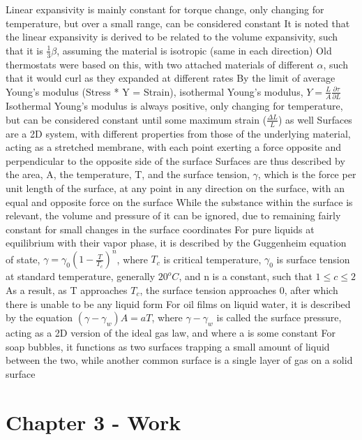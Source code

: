 \begin{outline*}
\4 Linear expansivity is mainly constant for torque change, only changing for temperature, but over a small range, can be considered constant
\4 It is noted that the linear expansivity is derived to be related to the volume expansivity, such that it is $\frac{1}{3}\beta$, assuming the material is isotropic (same in each direction)
\4 Old thermostats were based on this, with two attached materials of different $\alpha$, such that it would curl as they expanded at different rates
\3 By the limit of average Young's modulus (Stress * Y = Strain), isothermal Young's modulus, $Y = \frac{L}{A}\frac{\partial \tau}{\partial L}$
\4 Isothermal Young's modulus is always positive, only changing for temperature, but can be considered constant until some maximum strain ($\frac{\Delta L}{L}$) as well
\1 Surfaces are a 2D system, with different properties from those of the underlying material, acting as a stretched membrane, with each point exerting a force opposite and perpendicular to the opposite side of the surface
\2 Surfaces are thus described by the area, A, the temperature, T, and the surface tension, $\gamma$, which is the force per unit length of the surface, at any point in any direction on the surface, with an equal and opposite force on the surface
\2 While the substance within the surface is relevant, the volume and pressure of it can be ignored, due to remaining fairly constant for small changes in the surface coordinates
\2 For pure liquids at equilibrium with their vapor phase, it is described by the Guggenheim equation of state, $\gamma = \gamma_0(1 - \frac{T}{T_c})^n$, where $T_c$ is critical temperature, $\gamma_0$ is surface tension at standard temperature, generally $20^o C$, and n is a constant, such that $1 \leq c \leq 2$
\3 As a result, as T approaches $T_c$, the surface tension approaches 0, after which there is unable to be any liquid form
\2 For oil films on liquid water, it is described by the equation $(\gamma - \gamma_w)A = aT$, where $\gamma - \gamma_w$ is called the surface pressure, acting as a 2D version of the ideal gas law, and where a is some constant
\2 For soap bubbles, it functions as two surfaces trapping a small amount of liquid between the two, while another common surface is a single layer of gas on a solid surface
\end{outline*}
\section{Chapter 3 - Work}
